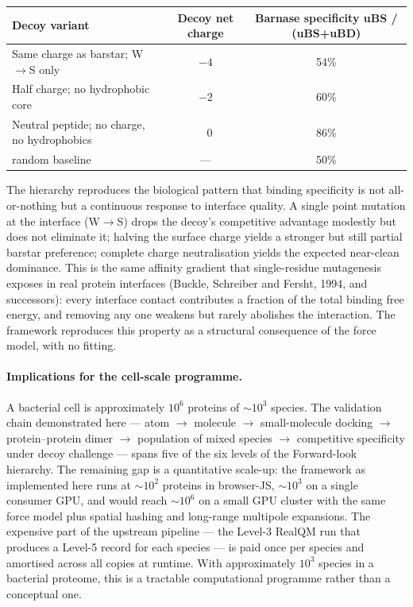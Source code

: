 \documentclass[11pt]{article}
\begin{document}
\begin{center}
\begin{tabular}{lcc}
\hline
\textbf{Decoy variant} & \textbf{Decoy net charge} & \textbf{Barnase specificity uBS / (uBS+uBD)} \\
\hline
Same charge as barstar; W$\to$S only         & $-4$ & 54\% \\
Half charge; no hydrophobic core             & $-2$ & 60\% \\
Neutral peptide; no charge, no hydrophobics  &  $\;\;\,0$ & 86\% \\
random baseline                              & ---  & 50\% \\
\hline
\end{tabular}
\end{center}

The hierarchy reproduces the biological pattern that binding specificity is not all-or-nothing but a continuous response to interface quality. A single point mutation at the interface (W$\to$S) drops the decoy's competitive advantage modestly but does not eliminate it; halving the surface charge yields a stronger but still partial barstar preference; complete charge neutralisation yields the expected near-clean dominance. This is the same affinity gradient that single-residue mutagenesis exposes in real protein interfaces (Buckle, Schreiber and Fersht, 1994, and successors): every interface contact contributes a fraction of the total binding free energy, and removing any one weakens but rarely abolishes the interaction. The framework reproduces this property as a structural consequence of the force model, with no fitting.

\paragraph{Implications for the cell-scale programme.}
A bacterial cell is approximately $10^6$ proteins of $\sim 10^3$ species. The validation chain demonstrated here --- atom $\to$ molecule $\to$ small-molecule docking $\to$ protein--protein dimer $\to$ population of mixed species $\to$ competitive specificity under decoy challenge --- spans five of the six levels of the Forward-look hierarchy. The remaining gap is a quantitative scale-up: the framework as implemented here runs at $\sim 10^2$ proteins in browser-JS, $\sim 10^3$ on a single consumer GPU, and would reach $\sim 10^6$ on a small GPU cluster with the same force model plus spatial hashing and long-range multipole expansions. The expensive part of the upstream pipeline --- the Level-3 RealQM run that produces a Level-5 record for each species --- is paid once per species and amortised across all copies at runtime. With approximately $10^3$ species in a bacterial proteome, this is a tractable computational programme rather than a conceptual one.
\end{document}

